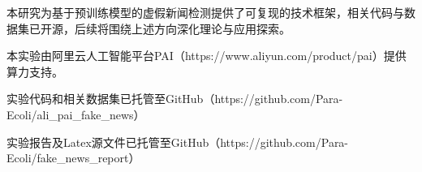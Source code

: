 \documentclass{cjc}
\begin{document}
本研究为基于预训练模型的虚假新闻检测提供了可复现的技术框架，相关代码与数据集已开源，后续将围绕上述方向深化理论与应用探索。

\newpage

\begin{acknowledgments}

本实验由阿里云人工智能平台PAI（https://www.aliyun.com/product/pai）提供算力支持。

实验代码和相关数据集已托管至GitHub（https://github.com/Para-Ecoli/ali\_pai\_fake\_news）

实验报告及Latex源文件已托管至GitHub（https://github.com/Para-Ecoli/fake\_news\_report）

\end{acknowledgments}




\end{document}
